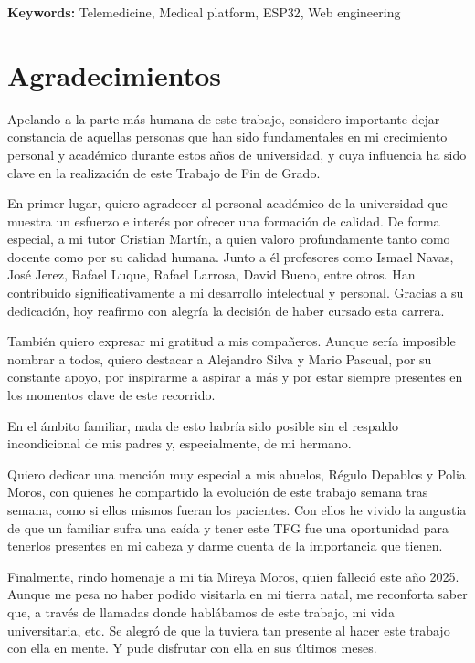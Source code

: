 \documentclass[12pt, a4paper]{article}
\begin{document}
	{\bfseries\large Keywords:} Telemedicine, Medical platform, ESP32, Web engineering
	

\clearpage
\section*{Agradecimientos}

Apelando a la parte más humana de este trabajo, considero importante dejar constancia de aquellas personas que han sido fundamentales en mi crecimiento personal y acad\'emico durante estos a\~nos de universidad, y cuya influencia ha sido clave en la realizaci\'on de este Trabajo de Fin de Grado.

En primer lugar, quiero agradecer al personal acad\'emico de la universidad que muestra un esfuerzo e interés por ofrecer una formaci\'on de calidad. De forma especial, a mi tutor Cristian Mart\'in, a quien valoro profundamente tanto como docente como por su calidad humana. Junto a \'el profesores como Ismael Navas, Jos\'e Jerez, Rafael Luque, Rafael Larrosa, David Bueno, entre otros. Han contribuido significativamente a mi desarrollo intelectual y personal. Gracias a su dedicaci\'on, hoy reafirmo con alegría la decisi\'on de haber cursado esta carrera.

Tambi\'en quiero expresar mi gratitud a mis compa\~neros. Aunque ser\'ia imposible nombrar a todos, quiero destacar a Alejandro Silva y Mario Pascual, por su constante apoyo, por inspirarme a aspirar a más y por estar siempre presentes en los momentos clave de este recorrido.

En el \'ambito familiar, nada de esto habr\'ia sido posible sin el respaldo incondicional de mis padres y, especialmente, de mi hermano.

Quiero dedicar una menci\'on muy especial a mis abuelos, R\'egulo Depablos y Polia Moros, con quienes he compartido la evoluci\'on de este trabajo semana tras semana, como si ellos mismos fueran los pacientes. Con ellos he vivido la angustia de que un familiar sufra una caída y tener este TFG fue una oportunidad para tenerlos presentes en mi cabeza y darme cuenta de la importancia que tienen.

Finalmente, rindo homenaje a mi t\'ia Mireya Moros, quien falleci\'o este a\~no 2025. Aunque me pesa no haber podido visitarla en mi tierra natal, me reconforta saber que, a trav\'es de llamadas donde hablábamos de este trabajo, mi vida universitaria, etc. Se alegró de que la tuviera tan presente al hacer este trabajo con ella en mente. Y pude disfrutar con ella en sus últimos meses.
\end{document}
